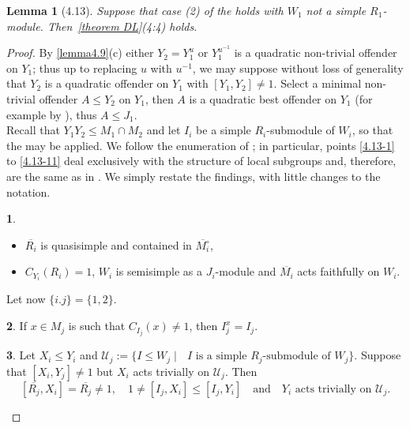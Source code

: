 \documentclass{amsart}
\numberwithin{equation}{section}
\newtheorem{lemma}[equation]{Lemma}
\theoremstyle{definition}
\theoremstyle{subresult}
\newtheorem{subresult}{}[equation]
\theoremstyle{caseresult}
\newcommand{\cU}{\mathcal{U}}
\newcommand{\ov}{\overline}
\newcommand{\inv}{^{-1}}
\newcommand{\<}{\langle}
\renewcommand{\>}{\rangle}
\begin{document}
\begin{lemma}[4.13]\label{lemma4.13}
	Suppose that case (2) of the  holds with $W_1$ not a simple $R_1$-module. Then~\ref{theorem DL}(4:4) holds.
\end{lemma}
\begin{proof}
	By \ref{lemma4.9}(c) either $Y_2=Y_1^u$ or $Y_1^{u\inv}$ is a quadratic non-trivial offender on $Y_1$; thus up to replacing $u$ with $u\inv$, we may suppose without loss of generality that $Y_2$ is a quadratic offender on $Y_1$ with $[Y_1,Y_2] \ne 1$. Select a minimal non-trivial offender $A \le Y_2$ on $Y_1$, then $A$ is a quadratic best offender on $Y_1$ (for example by \cite[Lemma A.39]{Meier-Stell-Stroth:2012}), thus $A \le J_1$.\\
	Recall that $Y_1Y_2 \le M_1 \cap M_2$ and let $I_i$ be a simple $R_i$-submodule of $W_i$, so that the  may be applied. We follow the enumeration of \cite[Lemma 4.13]{Meier-Stell-Stroth:2012}; in particular, points \eqref{4.13-1} to \eqref{4.13-11} deal exclusively with the structure of local subgroups and, therefore, are  the same as in \cite[Lemma 4.13]{Meier-Stell-Stroth:2012}. We simply restate the findings, with little changes to the notation.
	
	\begin{subresult}\label{4.13-1}
		\begin{itemize}
			\item[(a)] $\ov{R_i}$ is quasisimple and contained in $\ov{M_i^\circ}$,
			\item[(b)] $C_{Y_i}(R_i) = 1$, $W_i$ is semisimple as a $J_i$-module and $\ov{M_i}$ acts faithfully on $W_i$.
		\end{itemize}
	\end{subresult}

	Let now $\{i.j\}=\{1,2\}$.
	\begin{subresult}\label{4.13-2}
		If $x \in M_j$ is such that $C_{I_j}(x) \ne 1$, then $I_j^x = I_j$.
	\end{subresult}

	\begin{subresult}\label{4.13-3}
		Let $X_i \le Y_i$ and $\cU_j := \{ I \le W_j \mid \text{ $I$ is a simple $R_j$-submodule of $W_j$} \}$. Suppose that $[X_i,Y_j] \ne 1$ but $X_i$ acts trivially on $\cU_j$. Then
		\[
		[\ov{R_j}, X_i] = \ov{R_j} \ne 1, \quad 1 \ne [I_j, X_i] \le [I_j,Y_i] \quad \text{and} \quad \text{$Y_i$ acts trivially on $\cU_j$.}
		\]		
	\end{subresult}


\end{proof}
\end{document}
